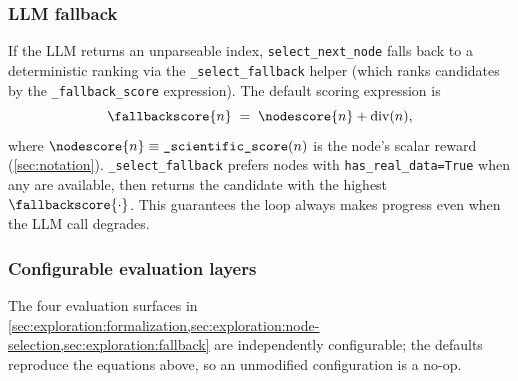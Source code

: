 \subsubsection*{LLM fallback}\label{sec:exploration:fallback}

If the LLM returns an unparseable index, \texttt{select\_next\_node}
falls back to a deterministic ranking via the
\texttt{\_select\_fallback} helper (which ranks candidates by the
\texttt{\_fallback\_score} expression). The default scoring expression
is
\begin{equation}\label{eq:fallback}
  \fallbackscore{n} \;=\; \nodescore{n} + \mathrm{div}(n),
\end{equation}
where $\nodescore{n}\equiv\texttt{\_scientific\_score}(n)$ is the
node's scalar reward (\cref{sec:notation}).
\texttt{\_select\_fallback} prefers nodes with
\texttt{has\_real\_data=True} when any are available, then returns the
candidate with the highest $\fallbackscore{\cdot}$. This guarantees
the loop always makes progress even when the LLM call degrades.

\subsubsection*{Configurable evaluation layers}\label{sec:exploration:config-layers}

The four evaluation surfaces in \cref{sec:exploration:formalization,sec:exploration:node-selection,sec:exploration:fallback}
are independently configurable; the defaults reproduce the equations
above, so an unmodified configuration is a no-op.

